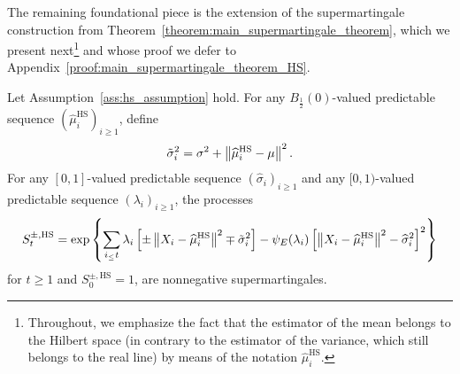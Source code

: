 The remaining foundational piece is the extension of the supermartingale construction from Theorem~\ref{theorem:main_supermartingale_theorem}, which we present next\footnote{Throughout, we emphasize the fact that the estimator of the mean belongs to the Hilbert space (in contrary to the estimator of the variance, which still belongs to the real line) by means of the notation $\widehat\mu_i^{\text{HS}}$.} and whose proof we defer to 
Appendix~\ref{proof:main_supermartingale_theorem_HS}.
\begin{theorem} \label{theorem:main_supermartingale_theorem_HS}
    Let Assumption~\ref{ass:hs_assumption} hold. For any $B_{\frac{1}{2}}(0)$-valued predictable sequence $(\widehat\mu_i^{\text{HS}})_{i \geq 1}$, define
    \begin{align*}
        \tilde\sigma_i^2 = \sigma^2 + \left\|\widehat\mu_i^{\text{HS}} - \mu\right\|^2.
    \end{align*}
    For any $[0, 1]$-valued predictable sequence  $(\widehat\sigma_i)_{i \geq 1}$ and any $[0, 1)$-valued predictable sequence  $(\lambda_i)_{i \geq 1}$, the processes
    \begin{align*}
        S_t^{\pm, \text{HS}} = \exp \left\{ \sum_{i_\leq t} \lambda_i \left[ \pm \left\| X_i - \widehat\mu_i^{\text{HS}}\right\|^2 \mp \tilde\sigma_i^2  \right] - \psi_E(\lambda_i) \left[ \left\| X_i - \widehat\mu_i^{\text{HS}}\right\|^2 - \widehat \sigma_i^2 \right]^2 \right\}
    \end{align*}
    for $t \geq 1$ and $S_0^{\pm, \text{HS}} = 1$,
    are nonnegative supermartingales.
\end{theorem}


